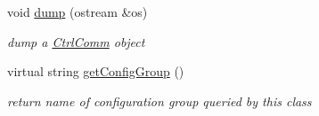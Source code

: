 \begin{DoxyCompactItemize}
\mbox{\label{classCtrlComm_a9b839913d19b1e7a57b0ff34ec4352a6}} 
void \hyperlink{classCtrlComm_a9b839913d19b1e7a57b0ff34ec4352a6}{dump} (ostream \&os)
\begin{DoxyCompactList}\small\item\em dump a \hyperlink{classCtrlComm}{Ctrl\+Comm} object \end{DoxyCompactList}\item 
\mbox{\label{classCtrlComm_a164cf89eda1d08f441a30d9e0bcb7155}} 
virtual string \hyperlink{classCtrlComm_a164cf89eda1d08f441a30d9e0bcb7155}{get\+Config\+Group} ()
\begin{DoxyCompactList}\small\item\em return name of configuration group queried by this class \end{DoxyCompactList}\end{DoxyCompactItemize}
